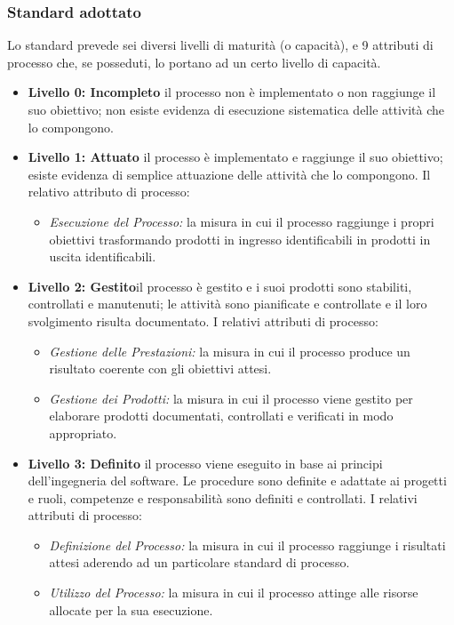 		\subsubsection{Standard adottato}
		Lo standard prevede sei diversi livelli di maturità (o capacità), e 9 attributi di processo che, se posseduti, lo portano ad un certo livello di capacità.
		\begin{itemize}
		\item \textbf{Livello 0: Incompleto} il processo non è implementato o non raggiunge il suo obiettivo;   non esiste evidenza di esecuzione sistematica delle attività che lo compongono.
		 \item \textbf{Livello 1: Attuato} il processo è implementato e raggiunge il suo obiettivo; esiste evidenza di semplice attuazione delle attività che lo compongono.
Il relativo attributo di processo:
			\begin{itemize}
				\item \emph{Esecuzione del Processo:} la misura in cui il processo raggiunge i propri obiettivi trasformando   prodotti in ingresso identificabili in prodotti in uscita identificabili.
			\end{itemize}
		\item \textbf{Livello 2: Gestito}il processo è gestito e i suoi prodotti sono stabiliti, controllati e manutenuti; le attività sono pianificate e controllate e il loro svolgimento risulta documentato.
I relativi attributi di processo:
			\begin{itemize}
				\item \emph{Gestione delle Prestazioni:} la misura in cui il processo produce un risultato coerente con gli obiettivi attesi.
				\item \emph{Gestione dei Prodotti:} la misura in cui il processo viene gestito per elaborare prodotti documentati, controllati e verificati in modo appropriato.
			\end{itemize}
 	
		\item \textbf{Livello 3: Definito} il processo viene eseguito in base ai principi dell'ingegneria del software. Le procedure sono definite e adattate ai progetti e ruoli, competenze e responsabilità sono definiti e controllati.
I relativi attributi di processo:
			\begin{itemize}
				\item \emph{Definizione del Processo:} la misura in cui il processo raggiunge i risultati attesi aderendo ad un particolare standard di processo.
				\item \emph{Utilizzo del Processo:} la misura in cui il processo attinge alle risorse allocate per la sua esecuzione.	
			\end{itemize}
			

\end{itemize}
